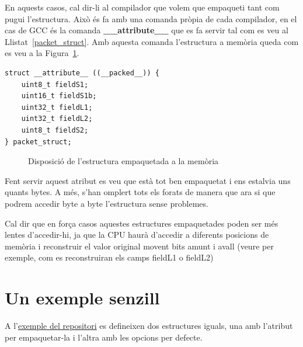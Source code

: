 En aquests casos, cal dir-li al compilador que volem que empaqueti tant com pugui l'estructura. Això és fa amb una comanda pròpia de cada compilador, en el cas de GCC és la comanda {\bf \_\_attribute\_\_} que es fa servir tal com es veu al Llistat~\ref{packet_struct}. Amb aquesta comanda l'estructura a memòria queda com es veu  a la Figura~\ref{fig:UnpackedMemoryStructure}.


\begin{lstlisting}[style=customc,caption={Estructura d'exemple empaquetada},label=packet_struct]
struct __attribute__ ((__packed__)) {
	uint8_t fieldS1;
	uint16_t fieldS1b;
	uint32_t fieldL1;
	uint32_t fieldL2;
	uint8_t fieldS2;
} packet_struct;
\end{lstlisting}


\begin{figure}
 \centering
 \caption{Disposició de l'estructura empaquetada a la memòria}
 \label{fig:UnpackedMemoryStructure}
\end{figure}

Fent servir aquest atribut es veu que està tot ben empaquetat i ens estalvia uns quants bytes. A més, s'han omplert tots els forats de manera que ara si que podrem accedir byte a byte l'estructura sense problemes.

Cal dir que en força casos aquestes estructures empaquetades poden ser més lentes d'accedir-hi, ja que la CPU haurà d'accedir a diferents posicions de memòria i reconstruir el valor original movent bits amunt i avall (veure per exemple, com es reconstruiran els camps fieldL1 o fieldL2)

\section{Un exemple senzill}

A l'\href{https://github.com/mariusmm/cursembedded/tree/master/Simplicity/Structures}{exemple del repositori} es defineixen dos estructures iguals, una amb l'atribut per empaquetar-la i l'altra amb les opcions per defecte.

